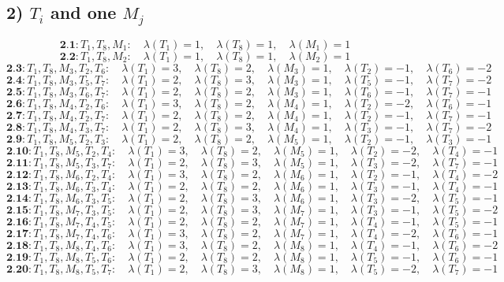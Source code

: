 \documentclass[12p]{article}
\numberwithin{equation}{section}
\begin{document}
\subsection*{2) $T_i$ and one $M_j$}
\[
\textbf{2.1}: T_1, T_8, M_1:\quad \lambda(T_1) = 1,\quad \lambda(T_8) = 1,\quad \lambda(M_1) = 1
\]
\[
\textbf{2.2}: T_1, T_8, M_2:\quad \lambda(T_1) = 1,\quad \lambda(T_8) = 1,\quad \lambda(M_2) = 1
\]
\[
\textbf{2.3}: T_1, T_8, M_3, T_2, T_6:\quad \lambda(T_1) = 3,\quad \lambda(T_8) = 2,\quad \lambda(M_3) = 1,\quad \lambda(T_2) = -1,\quad \lambda(T_6) = -2
\]
\[
\textbf{2.4}: T_1, T_8, M_3, T_5, T_7:\quad \lambda(T_1) = 2,\quad \lambda(T_8) = 3,\quad \lambda(M_3) = 1,\quad \lambda(T_5) = -1,\quad \lambda(T_7) = -2
\]
\[
\textbf{2.5}: T_1, T_8, M_3, T_6, T_7:\quad \lambda(T_1) = 2,\quad \lambda(T_8) = 2,\quad \lambda(M_3) = 1,\quad \lambda(T_6) = -1,\quad \lambda(T_7) = -1
\]
\[
\textbf{2.6}: T_1, T_8, M_4, T_2, T_6:\quad \lambda(T_1) = 3,\quad \lambda(T_8) = 2,\quad \lambda(M_4) = 1,\quad \lambda(T_2) = -2,\quad \lambda(T_6) = -1
\]
\[
\textbf{2.7}: T_1, T_8, M_4, T_2, T_7:\quad \lambda(T_1) = 2,\quad \lambda(T_8) = 2,\quad \lambda(M_4) = 1,\quad \lambda(T_2) = -1,\quad \lambda(T_7) = -1
\]
\[
\textbf{2.8}: T_1, T_8, M_4, T_3, T_7:\quad \lambda(T_1) = 2,\quad \lambda(T_8) = 3,\quad \lambda(M_4) = 1,\quad \lambda(T_3) = -1,\quad \lambda(T_7) = -2
\]
\[
\textbf{2.9}: T_1, T_8, M_5, T_2, T_3:\quad \lambda(T_1) = 2,\quad \lambda(T_8) = 2,\quad \lambda(M_5) = 1,\quad \lambda(T_2) = -1,\quad \lambda(T_3) = -1
\]
\[
\textbf{2.10}: T_1, T_8, M_5, T_2, T_4:\quad \lambda(T_1) = 3,\quad \lambda(T_8) = 2,\quad \lambda(M_5) = 1,\quad \lambda(T_2) = -2,\quad \lambda(T_4) = -1
\]
\[
\textbf{2.11}: T_1, T_8, M_5, T_3, T_7:\quad \lambda(T_1) = 2,\quad \lambda(T_8) = 3,\quad \lambda(M_5) = 1,\quad \lambda(T_3) = -2,\quad \lambda(T_7) = -1
\]
\[
\textbf{2.12}: T_1, T_8, M_6, T_2, T_4:\quad \lambda(T_1) = 3,\quad \lambda(T_8) = 2,\quad \lambda(M_6) = 1,\quad \lambda(T_2) = -1,\quad \lambda(T_4) = -2
\]
\[
\textbf{2.13}: T_1, T_8, M_6, T_3, T_4:\quad \lambda(T_1) = 2,\quad \lambda(T_8) = 2,\quad \lambda(M_6) = 1,\quad \lambda(T_3) = -1,\quad \lambda(T_4) = -1
\]
\[
\textbf{2.14}: T_1, T_8, M_6, T_3, T_5:\quad \lambda(T_1) = 2,\quad \lambda(T_8) = 3,\quad \lambda(M_6) = 1,\quad \lambda(T_3) = -2,\quad \lambda(T_5) = -1
\]
\[
\textbf{2.15}: T_1, T_8, M_7, T_3, T_5:\quad \lambda(T_1) = 2,\quad \lambda(T_8) = 3,\quad \lambda(M_7) = 1,\quad \lambda(T_3) = -1,\quad \lambda(T_5) = -2
\]
\[
\textbf{2.16}: T_1, T_8, M_7, T_4, T_5:\quad \lambda(T_1) = 2,\quad \lambda(T_8) = 2,\quad \lambda(M_7) = 1,\quad \lambda(T_4) = -1,\quad \lambda(T_5) = -1
\]
\[
\textbf{2.17}: T_1, T_8, M_7, T_4, T_6:\quad \lambda(T_1) = 3,\quad \lambda(T_8) = 2,\quad \lambda(M_7) = 1,\quad \lambda(T_4) = -2,\quad \lambda(T_6) = -1
\]
\[
\textbf{2.18}: T_1, T_8, M_8, T_4, T_6:\quad \lambda(T_1) = 3,\quad \lambda(T_8) = 2,\quad \lambda(M_8) = 1,\quad \lambda(T_4) = -1,\quad \lambda(T_6) = -2
\]
\[
\textbf{2.19}: T_1, T_8, M_8, T_5, T_6:\quad \lambda(T_1) = 2,\quad \lambda(T_8) = 2,\quad \lambda(M_8) = 1,\quad \lambda(T_5) = -1,\quad \lambda(T_6) = -1
\]
\[
\textbf{2.20}: T_1, T_8, M_8, T_5, T_7:\quad \lambda(T_1) = 2,\quad \lambda(T_8) = 3,\quad \lambda(M_8) = 1,\quad \lambda(T_5) = -2,\quad \lambda(T_7) = -1
\]
\end{document}
